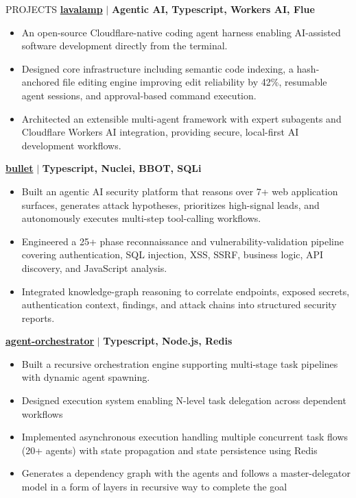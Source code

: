 \documentclass{resume} %
\begin{document}


\begin{rSection}{PROJECTS}
    \textbf{\href{https://github.com/Rahuletto/lavalamp}{lavalamp}} \(\mid\) \textbf{Agentic AI, Typescript, Workers AI, Flue}
\begin{itemize}
\itemsep -3pt{}
\item An open-source Cloudflare-native coding agent harness enabling AI-assisted software development directly from the terminal.
\item Designed core infrastructure including semantic code indexing, a hash-anchored file editing engine improving edit reliability by 42\%, resumable agent sessions, and approval-based command execution.
\item Architected an extensible multi-agent framework with expert subagents and Cloudflare Workers AI integration, providing secure, local-first AI development workflows.
\end{itemize}

\textbf{\href{https://github.com/forbiddenpacket/bullet}{bullet}} \(\mid\) \textbf{Typescript, Nuclei, BBOT, SQLi}
\begin{itemize}
\itemsep -3pt{}
\item Built an agentic AI security platform that reasons over 7+ web application surfaces, generates attack hypotheses, prioritizes high-signal leads, and autonomously executes multi-step tool-calling workflows.
\item Engineered a 25+ phase reconnaissance and vulnerability-validation pipeline covering authentication, SQL injection, XSS, SSRF, business logic, API discovery, and JavaScript analysis.
\item Integrated knowledge-graph reasoning to correlate endpoints, exposed secrets, authentication context, findings, and attack chains into structured security reports.
\end{itemize}

\textbf{\href{https://github.com/Rahuletto/agent-orchestrator}{agent-orchestrator}} \(\mid\) \textbf{Typescript, Node.js, Redis}
\begin{itemize}
\itemsep -3pt{}
\item Built a recursive orchestration engine supporting multi-stage task pipelines with dynamic agent spawning.
\item Designed execution system enabling N-level task delegation across dependent workflows
\item Implemented asynchronous execution handling multiple concurrent task flows (20+ agents) with state propagation and state persistence using Redis
\item Generates a dependency graph with the agents and follows a master-delegator model in a form of layers in recursive way to complete the goal
\end{itemize}
\end{rSection}
\end{document}
